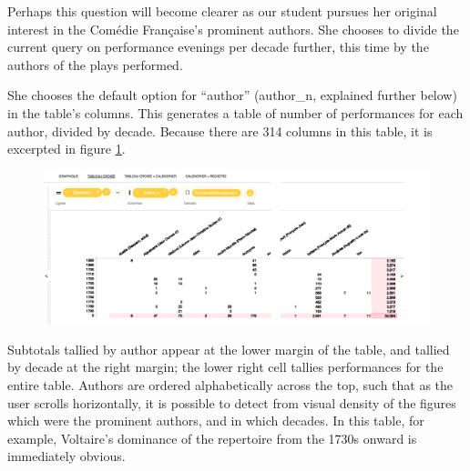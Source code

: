 \documentclass[	DIV=calc,%
							paper=a4,%
							fontsize=11pt,%
							twocolumn]{scrartcl}	 					%
\begin{document}
Perhaps this question will become clearer as our student pursues her original interest in the Comédie Française’s prominent authors.  She chooses to divide the current query on performance evenings per decade further, this time by the authors of the plays performed.

She chooses the default option for ``author'' (author\_n, explained further below) in the table’s columns.  This generates a table of number of performances for each author, divided by decade.  Because there are 314 columns in this table, it is excerpted in figure \ref{fig:stitched-author-table}.

\begin{figure}
  \centering
	\includegraphics[width=7in]{steps/stitched-author-table.png}
	\caption{}
	\label{fig:stitched-author-table}
\end{figure}

Subtotals tallied by author appear at the lower margin of the table, and tallied by decade at the right margin; the lower right cell tallies performances for the entire table.  Authors are ordered alphabetically across the top, such that as the user scrolls horizontally, it is possible to detect from visual density of the figures which were the prominent authors, and in which decades.  In this table, for example, Voltaire’s dominance of the repertoire from the 1730s onward is immediately obvious.
\end{document}
